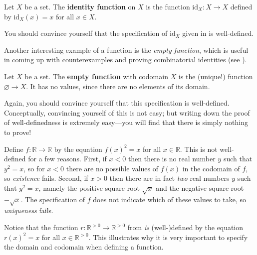 \begin{definition}
\label{defIdentityFunction}
Let $X$ be a set. The \textbf{identity function} on $X$ is the function $\mathrm{id}_X : X \to X$  defined by $\mathrm{id}_X(x)=x$ for all $x \in X$.
\end{definition}

You should convince yourself that the specification of $\mathrm{id}_X$ given in  is well-defined.

Another interesting example of a function is the \textit{empty function}, which is useful in coming up with counterexamples and proving combinatorial identities (see ).

\begin{definition}
\label{defEmptyFunction}
Let $X$ be a set. The \textbf{empty function} with codomain $X$ is the (unique!) function $\varnothing \to X$. It has no values, since there are no elements of its domain.
\end{definition}

Again, you should convince yourself that this specification is well-defined. Conceptually, convincing yourself of this is not easy; but writing down the proof of well-definedness is extremely easy---you will find that there is simply nothing to prove!

\begin{example}
Define $f : \mathbb{R} \to \mathbb{R}$ by the equation $f(x)^2=x$ for all $x \in \mathbb{R}$. This is not well-defined for a few reasons. First, if $x<0$ then there is no real number $y$ such that $y^2=x$, so for $x<0$ there are no possible values of $f(x)$ in the codomain of $f$, so \textit{existence} fails. Second, if $x>0$ then there are in fact \textit{two} real numbers $y$ such that $y^2=x$, namely the positive square root $\sqrt{x}$ and the negative square root $-\sqrt{x}$. The specification of $f$ does not indicate which of these values to take, so \textit{uniqueness} fails.

Notice that the function $r : \mathbb{R}^{>0} \to \mathbb{R}^{>0}$ from  \textit{is} (well-)defined by the equation $r(x)^2 = x$ for all $x \in \mathbb{R}^{>0}$. This illustrates why it is very important to specify the domain and codomain when defining a function.
\end{example}

